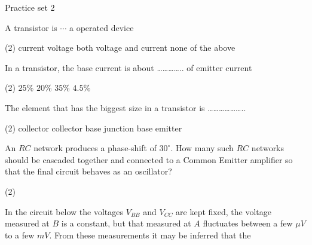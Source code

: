 \newpage
\begin{abox}
	Practice set 2 
	\end{abox}
\begin{enumerate}
	\begin{minipage}{\textwidth}
		\item  A transistor is $\cdots$ a operated device
	\end{minipage}
	\begin{tasks}(2)
		\task[\textbf{A.}] current
		\task[\textbf{B.}] voltage
		\task[\textbf{C.}]both voltage and current
		\task[\textbf{D.}]none of the above
	\end{tasks}
\begin{minipage}{\textwidth}
	\item In a transistor, the base current is about ………….. of emitter current
\end{minipage}
\begin{tasks}(2)
	\task[\textbf{A.}] $25 \%$
	\task[\textbf{B.}] $20 \%$
	\task[\textbf{C.}] $35 \%$
	\task[\textbf{D.}]$4.5 \%$ 
\end{tasks}
\begin{minipage}{\textwidth}
	\item The element that has the biggest size in a transistor is ………………..
\end{minipage}
\begin{tasks}(2)
	\task[\textbf{A.}] collector
	\task[\textbf{B.}] collector base junction
	\task[\textbf{C.}]base
	\task[\textbf{D.}]emitter
\end{tasks}
	 \begin{minipage}{\textwidth}
		\item An $R C$ network produces a phase-shift of $30^{\circ} .$ How many such $R C$ networks should be cascaded together and connected to a Common Emitter amplifier so that the final circuit behaves as an oscillator?
	\end{minipage}
	\begin{tasks}(2)
	\end{tasks}
\begin{minipage}{\textwidth}
	\item In the circuit below the voltages $V_{B B}$ and $V_{C C}$ are kept fixed, the voltage measured at $B$ is a constant, but that measured at $A$ fluctuates between a few $\mu V$ to a few $m V$.
	From these measurements it may be inferred that the\\
\begin{figure}[H]

\end{figure}
\end{minipage}
\end{enumerate}
